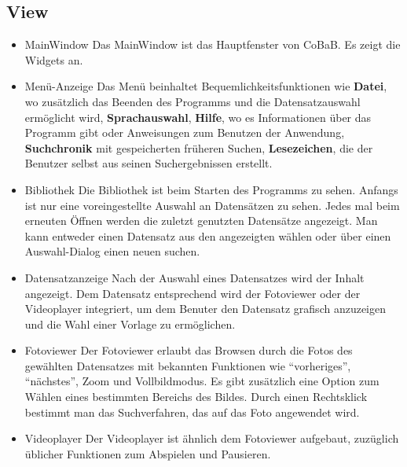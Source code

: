 \subsection{View}
\begin{itemize}
\item MainWindow \newline
Das MainWindow ist das Hauptfenster von CoBaB. Es zeigt die \glspl{Widget} an.

\item Menü-Anzeige \newline
Das Menü beinhaltet Bequemlichkeitsfunktionen wie \textbf{Datei}, wo zusätzlich das Beenden des Programms und die Datensatzauswahl ermöglicht wird, \textbf{Sprachauswahl}, \textbf{Hilfe}, wo es Informationen über das Programm gibt oder Anweisungen zum Benutzen der Anwendung, \textbf{\gls{Suchchronik}} mit gespeicherten früheren Suchen, \textbf{\gls{Lesezeichen}}, die der Benutzer selbst aus seinen Suchergebnissen erstellt.

\item Bibliothek \newline
Die Bibliothek ist beim Starten des Programms zu sehen. Anfangs ist nur eine voreingestellte Auswahl an Datensätzen zu sehen. Jedes mal beim erneuten Öffnen werden die zuletzt genutzten Datensätze angezeigt. Man kann entweder einen Datensatz aus den angezeigten wählen oder über einen Auswahl-\gls{Dialog} einen neuen suchen.

\item Datensatzanzeige \newline
Nach der Auswahl eines Datensatzes wird der Inhalt angezeigt. Dem Datensatz entsprechend wird der Fotoviewer oder der Videoplayer integriert, um dem Benuter den Datensatz grafisch anzuzeigen und die Wahl einer Vorlage zu ermöglichen.

\item Fotoviewer \newline
Der Fotoviewer erlaubt das Browsen durch die Fotos des gewählten Datensatzes mit bekannten Funktionen wie \enquote{vorheriges}, \enquote{nächstes}, Zoom und Vollbildmodus. Es gibt zusätzlich eine Option zum Wählen eines bestimmten Bereichs des Bildes. Durch einen Rechtsklick bestimmt man das \gls{Suchverfahren}, das auf das Foto angewendet wird.

\item Videoplayer \newline
Der Videoplayer ist ähnlich dem Fotoviewer aufgebaut, zuzüglich üblicher Funktionen zum Abspielen und Pausieren.


\end{itemize}
